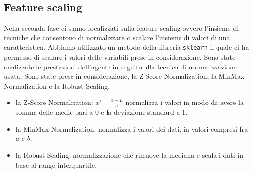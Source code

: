 \newpage
\subsection{Feature scaling}
\fancyhead{}    %
Nella seconda fase ci siamo focalizzati sulla feature scaling ovvero l’insieme di tecniche che consentono di normalizzare o scalare l’insieme di valori di una caratteristica. Abbiamo utilizzato un metodo della libreria \texttt{sklearn} il quale ci ha permesso di scalare i valori delle variabili prese in considerazione. Sono state analizzate le prestazioni dell’agente in seguito alla tecnica di normalizzazione usata. Sono state prese in considerazione, la Z-Score Normalization, la MinMax Normalization e la Robust Scaling.
\begin{itemize}
    \item la Z-Score Normalization: \( x' = \frac{x - \mu}{\sigma} \) normalizza i valori in modo da avere la somma delle medie pari a 0 e la deviazione standard a 1.
    \item la MinMax Normalization: normalizza i valori dei dati, in valori compresi fra \(a\) e \(b\).
    \item la Robust Scaling: normalizzazione che rimuove la mediana e scala i dati in base al range interquartile.
\end{itemize}
